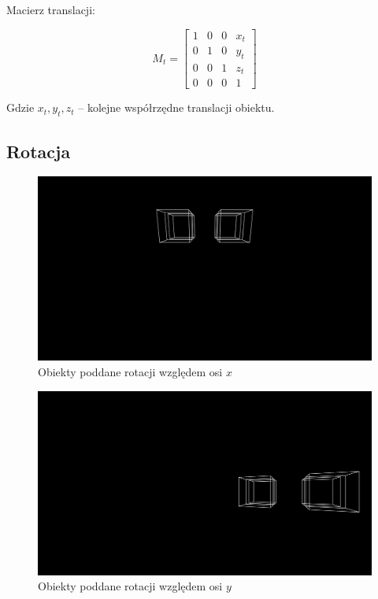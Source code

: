 \documentclass{article}
\begin{document}
        Macierz translacji:

        \begin{equation}
            M_t=
            \begin{bmatrix}
                1 & 0 & 0 & x_t \\
                0 & 1 & 0 & y_t \\
                0 & 0 & 1 & z_t \\
                0 & 0 &0 & 1
            \end{bmatrix}
        \end{equation}

        Gdzie \(x_t, y_t, z_t\) -- kolejne współrzędne translacji obiektu.

    \subsection{Rotacja}

        \begin{figure}
            \includegraphics[width=\textwidth]{rotate_x}
            \caption{Obiekty poddane rotacji względem osi \(x\)}
            \centering
        \end{figure}

        \begin{figure}
            \includegraphics[width=\textwidth]{rotate_y}
            \caption{Obiekty poddane rotacji względem osi \(y\)}
            \centering
        \end{figure}
\end{document}
